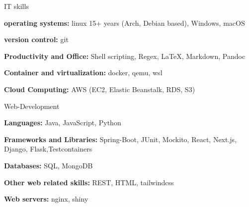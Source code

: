

\begin{cvskills}
  \cvskill
    {IT skills} %
    {
      \begin{cvitems}
        \item {\textbf{operating systems:} linux 15+ years (Arch, Debian based), Windows, macOS}
        \item {\textbf{version control:} git}
        \item {\textbf{Productivity and Office:} Shell scripting, Regex, LaTeX, Markdown, Pandoc}
        \item {\textbf{Container and virtualization:} docker, qemu, wsl}
        \item {\textbf{Cloud Computing:} AWS (EC2, Elastic Beanstalk, RDS, S3)}
      \end{cvitems}
      }
\cvskill
{Web-Development}%
{
  \begin{cvitems}
    \item {\textbf{Languages:} Java, JavaScript, Python}
    \item {\textbf{Frameworks and Libraries:} Spring-Boot, JUnit, Mockito, React, Next.js, Django, Flask,\newline Testcontainers}
    \item {\textbf{Databases:} SQL, MongoDB}
    \item {\textbf{Other web related skills:} REST, HTML, tailwindcss}
    \item {\textbf{Web servers:} nginx, shiny}
  \end{cvitems}
}


\end{cvskills}
